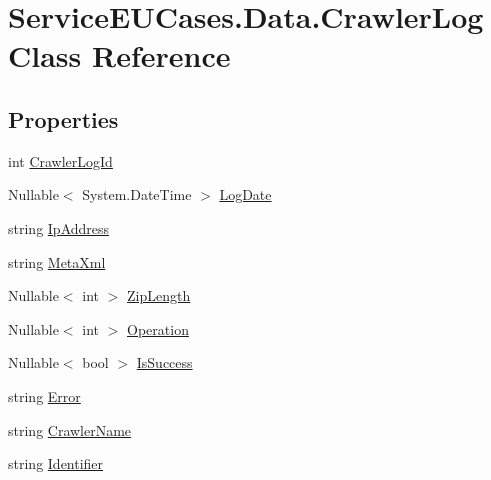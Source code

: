 \hypertarget{class_service_e_u_cases_1_1_data_1_1_crawler_log}{\section{Service\-E\-U\-Cases.\-Data.\-Crawler\-Log Class Reference}
\label{class_service_e_u_cases_1_1_data_1_1_crawler_log}
}
\subsection*{Properties}
\begin{DoxyCompactItemize}
\item 
int \hyperlink{class_service_e_u_cases_1_1_data_1_1_crawler_log_ae1b7dc9fdfad9695e919f8685c290d8f}{Crawler\-Log\-Id}
\item 
Nullable$<$ System.\-Date\-Time $>$ \hyperlink{class_service_e_u_cases_1_1_data_1_1_crawler_log_a7df3e36d6aa20057f7f4d68da6ffb748}{Log\-Date}
\item 
string \hyperlink{class_service_e_u_cases_1_1_data_1_1_crawler_log_a204d2ba47042efb893b73b187880d490}{Ip\-Address}
\item 
string \hyperlink{class_service_e_u_cases_1_1_data_1_1_crawler_log_abf82886310fb134885c6cc1193d60512}{Meta\-Xml}
\item 
Nullable$<$ int $>$ \hyperlink{class_service_e_u_cases_1_1_data_1_1_crawler_log_a88b172286eb2a3f053a2ed41c47e4724}{Zip\-Length}
\item 
Nullable$<$ int $>$ \hyperlink{class_service_e_u_cases_1_1_data_1_1_crawler_log_ae457ab6f2f1dd73d06bf0c4528bc7f51}{Operation}
\item 
Nullable$<$ bool $>$ \hyperlink{class_service_e_u_cases_1_1_data_1_1_crawler_log_a840f582701cfcff1c3f66815a8fd3fed}{Is\-Success}
\item 
string \hyperlink{class_service_e_u_cases_1_1_data_1_1_crawler_log_a28c9de2d834734b534ca0956e515cc37}{Error}
\item 
string \hyperlink{class_service_e_u_cases_1_1_data_1_1_crawler_log_a290c6dd1044237415079dc390e3b5e05}{Crawler\-Name}
\item 
string \hyperlink{class_service_e_u_cases_1_1_data_1_1_crawler_log_a844837e2cdbcadfa3bf174057afbe874}{Identifier}
\end{DoxyCompactItemize}


